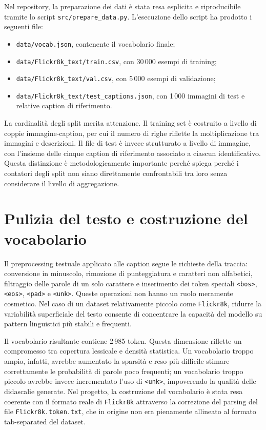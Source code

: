\documentclass[11pt,a4paper]{report}
\newcommand{\dataset}{\texttt{Flickr8k}}
\newcommand{\bos}{\texttt{<bos>}}
\newcommand{\eos}{\texttt{<eos>}}
\newcommand{\pad}{\texttt{<pad>}}
\newcommand{\unk}{\texttt{<unk>}}
\begin{document}
Nel repository, la preparazione dei dati è stata resa esplicita e riproducibile tramite lo script \texttt{src/prepare\_data.py}. L'esecuzione dello script ha prodotto i seguenti file:
\begin{itemize}[leftmargin=*]
  \item \texttt{data/vocab.json}, contenente il vocabolario finale;
  \item \texttt{data/Flickr8k\_text/train.csv}, con 30\,000 esempi di training;
  \item \texttt{data/Flickr8k\_text/val.csv}, con 5\,000 esempi di validazione;
  \item \texttt{data/Flickr8k\_text/test\_captions.json}, con 1\,000 immagini di test e relative caption di riferimento.
\end{itemize}

La cardinalità degli split merita attenzione. Il training set è costruito a livello di coppie immagine-caption, per cui il numero di righe riflette la moltiplicazione tra immagini e descrizioni. Il file di test è invece strutturato a livello di immagine, con l'insieme delle cinque caption di riferimento associato a ciascun identificativo. Questa distinzione è metodologicamente importante perché spiega perché i contatori degli split non siano direttamente confrontabili tra loro senza considerare il livello di aggregazione.

\section{Pulizia del testo e costruzione del vocabolario}

Il preprocessing testuale applicato alle caption segue le richieste della traccia: conversione in minuscolo, rimozione di punteggiatura e caratteri non alfabetici, filtraggio delle parole di un solo carattere e inserimento dei token speciali \bos{}, \eos{}, \pad{} e \unk{}. Queste operazioni non hanno un ruolo meramente cosmetico. Nel caso di un dataset relativamente piccolo come \dataset{}, ridurre la variabilità superficiale del testo consente di concentrare la capacità del modello su pattern linguistici più stabili e frequenti.

Il vocabolario risultante contiene 2\,985 token. Questa dimensione riflette un compromesso tra copertura lessicale e densità statistica. Un vocabolario troppo ampio, infatti, avrebbe aumentato la sparsità e reso più difficile stimare correttamente le probabilità di parole poco frequenti; un vocabolario troppo piccolo avrebbe invece incrementato l'uso di \unk{}, impoverendo la qualità delle didascalie generate. Nel progetto, la costruzione del vocabolario è stata resa coerente con il formato reale di \dataset{} attraverso la correzione del parsing del file \texttt{Flickr8k.token.txt}, che in origine non era pienamente allineato al formato tab-separated del dataset.
\end{document}

